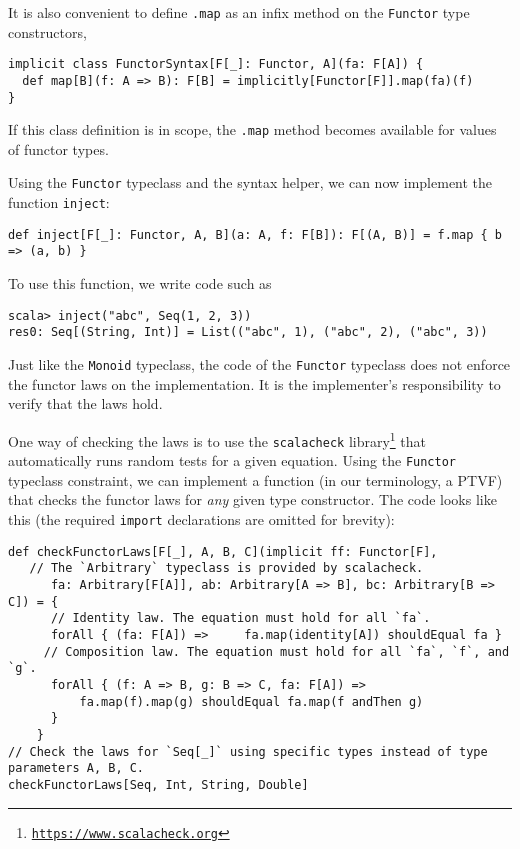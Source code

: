 It is also convenient to define \lstinline!.map! as an infix method
on the \lstinline!Functor! type constructors,
\begin{lstlisting}
implicit class FunctorSyntax[F[_]: Functor, A](fa: F[A]) {
  def map[B](f: A => B): F[B] = implicitly[Functor[F]].map(fa)(f)
}
\end{lstlisting}
If this class definition is in scope, the \lstinline!.map! method
becomes available for values of functor types.

Using the \lstinline!Functor! typeclass and the syntax helper, we
can now implement the function \lstinline!inject!:
\begin{lstlisting}
def inject[F[_]: Functor, A, B](a: A, f: F[B]): F[(A, B)] = f.map { b => (a, b) }
\end{lstlisting}
To use this function, we write code such as
\begin{lstlisting}
scala> inject("abc", Seq(1, 2, 3))
res0: Seq[(String, Int)] = List(("abc", 1), ("abc", 2), ("abc", 3))
\end{lstlisting}

Just like the \lstinline!Monoid! typeclass, the code of the \lstinline!Functor!
typeclass does not enforce the functor laws on the implementation.
It is the implementer's responsibility to verify that the laws hold.

One way of checking the laws is to use the \texttt{scalacheck} library\footnote{\texttt{\href{https://www.scalacheck.org}{https://www.scalacheck.org}}}
that automatically runs random tests for a given equation. Using the
\lstinline!Functor! typeclass constraint, we can implement a function
(in our terminology, a PTVF) that checks the functor laws for \emph{any}
given type constructor. The code looks like this (the required \lstinline!import!
declarations are omitted for brevity):
\begin{lstlisting}
def checkFunctorLaws[F[_], A, B, C](implicit ff: Functor[F],
   // The `Arbitrary` typeclass is provided by scalacheck.
      fa: Arbitrary[F[A]], ab: Arbitrary[A => B], bc: Arbitrary[B => C]) = {
      // Identity law. The equation must hold for all `fa`.
      forAll { (fa: F[A]) =>     fa.map(identity[A]) shouldEqual fa }
     // Composition law. The equation must hold for all `fa`, `f`, and `g`.
      forAll { (f: A => B, g: B => C, fa: F[A]) =>
          fa.map(f).map(g) shouldEqual fa.map(f andThen g)
      }
    }
// Check the laws for `Seq[_]` using specific types instead of type parameters A, B, C.
checkFunctorLaws[Seq, Int, String, Double]
\end{lstlisting}

